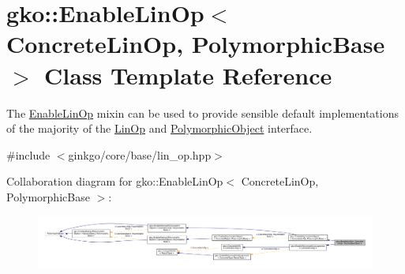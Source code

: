 \hypertarget{classgko_1_1EnableLinOp}{}\section{gko\+:\+:Enable\+Lin\+Op$<$ Concrete\+Lin\+Op, Polymorphic\+Base $>$ Class Template Reference}
\label{classgko_1_1EnableLinOp}


The \hyperlink{classgko_1_1EnableLinOp}{Enable\+Lin\+Op} mixin can be used to provide sensible default implementations of the majority of the \hyperlink{classgko_1_1LinOp}{Lin\+Op} and \hyperlink{classgko_1_1PolymorphicObject}{Polymorphic\+Object} interface.  




{\ttfamily \#include $<$ginkgo/core/base/lin\+\_\+op.\+hpp$>$}



Collaboration diagram for gko\+:\+:Enable\+Lin\+Op$<$ Concrete\+Lin\+Op, Polymorphic\+Base $>$\+:
\nopagebreak
\begin{figure}[H]
\begin{center}
\leavevmode
\includegraphics[width=350pt]{classgko_1_1EnableLinOp__coll__graph}
\end{center}
\end{figure}
